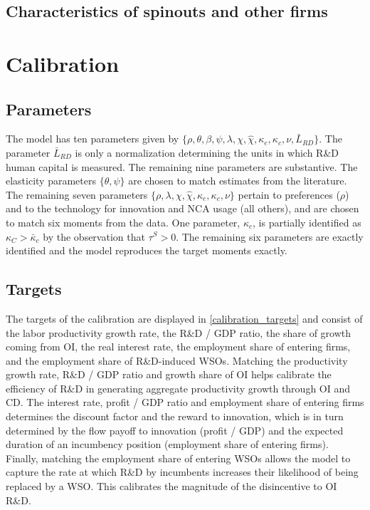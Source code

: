 \documentclass[11pt,english]{article}
\begin{document}
\subsection{Characteristics of spinouts and other firms}

\section{Calibration}

\subsection{Parameters}

The model has ten parameters given by $\{\rho, \theta, \beta, \psi, \lambda, \chi, \hat{\chi}, \kappa_e, \kappa_c, \nu, \bar{L}_{RD}\}$. The parameter $\bar{L}_{RD}$ is only a normalization determining the units in which R\&D human capital is measured. The remaining nine parameters are substantive. The elasticity parameters $\{\theta, \psi\}$ are chosen to match estimates from the literature. The remaining seven parameters $\{\rho, \lambda, \chi, \hat{\chi}, \kappa_e, \kappa_c, \nu\}$ pertain to preferences ($\rho$) and to the technology for innovation and NCA usage (all others), and are chosen to match six moments from the data. One parameter, $\kappa_c$, is partially identified as $\kappa_C > \bar{\kappa}_c$ by the observation that $\tau^S > 0$. The remaining six parameters are exactly identified and the model reproduces the target moments exactly. 

\subsection{Targets}

The targets of the calibration are displayed in \autoref{calibration_targets} and consist of the labor productivity growth rate, the R\&D / GDP ratio, the share of growth coming from OI, the real interest rate, the employment share of entering firms, and the employment share of R\&D-induced WSOs. Matching the productivity growth rate, R\&D / GDP ratio and growth share of OI helps calibrate the efficiency of R\&D in generating aggregate productivity growth through OI and CD. The interest rate, profit / GDP ratio and employment share of entering firms determines the discount factor and the reward to innovation, which is in turn determined by the flow payoff to innovation (profit / GDP) and the expected duration of an incumbency position (employment share of entering firms). Finally, matching the employment share of entering WSOs allows the model to capture the rate at which R\&D by incumbents increases their likelihood of being replaced by a WSO. This calibrates the magnitude of the disincentive to OI R\&D.
\end{document}
